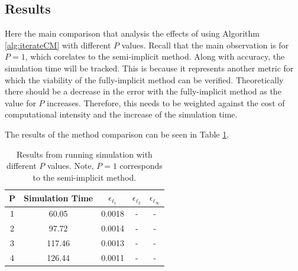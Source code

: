 %
%
%

\subsection{Results}
  Here the main comparison that analysis the effects of using Algorithm \ref{alg:iterateCM} with different $P$ values.
  Recall that the main observation is for $P = 1$, which corelates to the semi-implicit method. 
  Along with accuracy, the simulation time will be tracked.
  This is because it represents another metric for which the viability of the fully-implicit method can be verified.
  Theoretically there should be a decrease in the error with the fully-implicit method as the value for $P$ increases.
  Therefore, this needs to be weighted against the cost of computational intensity and the increase of the simulation time.

  
  The results of the method comparison can be seen in Table \ref{tab:tolerance_comparison}.

  
  \begin{table}[h!tb]
    \centering
    \begin{tabular}{|c|c|c|c|c|}
      \hline
      P & Simulation Time & $\epsilon_{\ell_1}$ & $\epsilon_{\ell_2}$ & $\epsilon_{\ell_\infty}$  \\
      \hline
      1& 60.05 & 0.0018 & - & - \\
      2& 97.72  & 0.0014 & - & - \\
      3& 117.46 & 0.0013 & - & - \\
      4& 126.44 & 0.0011& - & - \\
      \hline
    \end{tabular}
    \caption{Results from running simulation with different $P$ values. Note, $P = 1$ corresponds to the semi-implicit method.}
    \label{tab:tolerance_comparison}
  \end{table}
  
